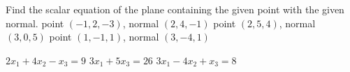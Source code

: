 
\begin{Exercise}[
name={},
title={}, 
difficulty=0,
origin={\cite{SM}}]
Find the scalar equation of the plane containing the given point with the given normal.
\Question point $(-1,2,-3)$, normal $(2,4,-1)$
\Question point $(2,5,4)$, normal $(3,0,5)$
\Question point $(1,-1,1)$, normal $(3,-4,1)$
\end{Exercise}

\begin{Answer}
\Question $2x_1+4x_2-x_3=9$
\Question $3x_1+5x_3=26$
\Question $3x_1-4x_2+x_3=8$
\end{Answer}
